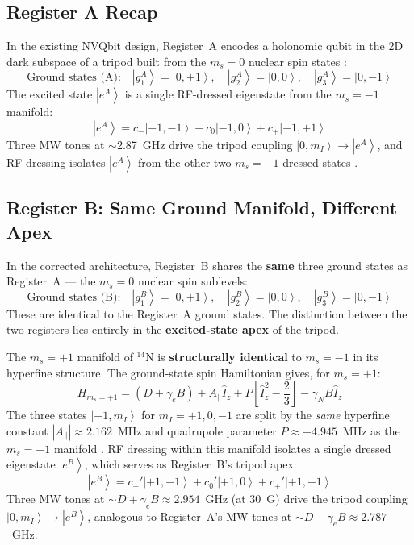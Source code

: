 \documentclass[11pt,letterpaper]{article}
\newcommand{\ket}[1]{\left|#1\right\rangle}
\begin{document}
\subsection{Register A Recap}

In the existing NVQbit design, Register~A encodes a holonomic qubit in the 2D dark subspace of a tripod built from the $m_s = 0$ nuclear spin states \cite{Biswas2026}:
\begin{equation}
    \text{Ground states (A):}\quad \ket{g_1^A} = \ket{0, +1},\quad \ket{g_2^A} = \ket{0, 0},\quad \ket{g_3^A} = \ket{0, -1}
\end{equation}
The excited state $\ket{e^A}$ is a single RF-dressed eigenstate from the $m_s = -1$ manifold:
\begin{equation}
    \ket{e^A} = c_- \ket{-1,-1} + c_0 \ket{-1,0} + c_+ \ket{-1,+1}
\end{equation}
Three MW tones at $\sim$2.87~GHz drive the tripod coupling $\ket{0, m_I} \to \ket{e^A}$, and RF dressing isolates $\ket{e^A}$ from the other two $m_s = -1$ dressed states \cite{Smeltzer2009, Tabuchi2022, Biswas2026}.

\subsection{Register B: Same Ground Manifold, Different Apex}

In the corrected architecture, Register~B shares the \textbf{same} three ground states as Register~A --- the $m_s = 0$ nuclear spin sublevels:
\begin{equation}
    \text{Ground states (B):}\quad \ket{g_1^B} = \ket{0, +1},\quad \ket{g_2^B} = \ket{0, 0},\quad \ket{g_3^B} = \ket{0, -1}
\end{equation}
These are identical to the Register~A ground states. The distinction between the two registers lies entirely in the \textbf{excited-state apex} of the tripod.

\medskip
\noindent The $m_s = +1$ manifold of $^{14}$N is \textbf{structurally identical} to $m_s = -1$ in its hyperfine structure. The ground-state spin Hamiltonian \cite{Doherty2013} gives, for $m_s = +1$:
\begin{equation}
    H_{m_s=+1} = (D + \gamma_e B) + A_\parallel \hat{I}_z + P\!\left[\hat{I}_z^2 - \frac{2}{3}\right] - \gamma_N B \hat{I}_z
\end{equation}
The three states $\ket{+1, m_I}$ for $m_I = +1, 0, -1$ are split by the \emph{same} hyperfine constant $|A_\parallel| \approx 2.162$~MHz and quadrupole parameter $P \approx -4.945$~MHz as the $m_s = -1$ manifold \cite{Doherty2013}. RF dressing within this manifold isolates a single dressed eigenstate $\ket{e^B}$, which serves as Register~B's tripod apex:
\begin{equation}
    \ket{e^B} = c_-' \ket{+1,-1} + c_0' \ket{+1,0} + c_+' \ket{+1,+1}
\end{equation}
Three MW tones at $\sim D + \gamma_e B \approx 2.954$~GHz (at 30~G) drive the tripod coupling $\ket{0, m_I} \to \ket{e^B}$, analogous to Register~A's MW tones at $\sim D - \gamma_e B \approx 2.787$~GHz.
\end{document}

